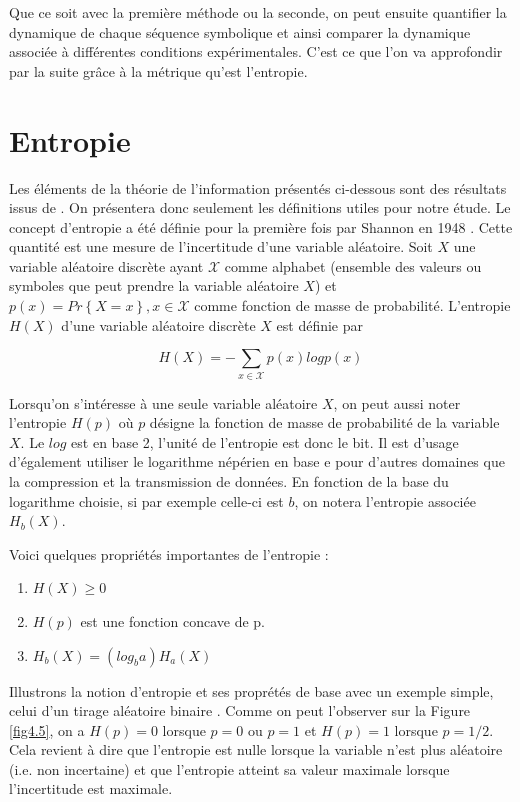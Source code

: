 \vspace{2ex}
Que ce soit avec la première méthode ou la seconde, on peut ensuite quantifier la dynamique de chaque séquence symbolique et ainsi comparer la dynamique associée à différentes conditions expérimentales. C'est ce que l'on va approfondir par la suite grâce à la métrique qu'est l'entropie.

\section{Entropie}

Les éléments de la théorie de l'information présentés ci-dessous sont des résultats issus de \cite{2}. On présentera donc seulement les définitions utiles pour notre étude.
Le concept d'entropie a été définie pour la première fois par Shannon en 1948 \cite{21}. Cette quantité est une mesure de l'incertitude d'une variable aléatoire.
Soit $X$ une variable aléatoire discrète ayant $\mathcal{X}$ comme alphabet (ensemble des valeurs ou symboles que peut prendre la variable aléatoire $X$) et $p(x)=Pr\left\{X=x\right\}, x \in \mathcal{X}$ comme fonction de masse de probabilité. 
L'entropie $H(X)$ d'une variable aléatoire discrète $X$ est définie par

\begin{equation}
    H(X) = - \sum_{x \in \mathcal{X}} p(x)logp(x)
\end{equation}

Lorsqu'on s'intéresse à une seule variable aléatoire $X$, on peut aussi noter l'entropie $H(p)$ où $p$ désigne la fonction de masse de probabilité de la variable $X$.
Le $log$ est en base 2, l'unité de l'entropie est donc le bit. Il est d'usage d'également utiliser le logarithme népérien en base e pour d'autres domaines que la compression et la transmission de données. En fonction de la base du logarithme choisie, si par exemple celle-ci est $b$, on notera l'entropie associée $H_b(X)$. 

Voici quelques propriétés importantes de l'entropie :
\begin{enumerate}
    \item $H(X)\geq0$
    \item $H(p)$ est une fonction concave de p.
    \item $H_b(X)=(log_{b}a)H_{a}(X)$
\end{enumerate}

Illustrons la notion d'entropie et ses proprétés de base avec un exemple simple, celui d'un tirage aléatoire binaire \cite{8}. Comme on peut l'observer sur la Figure \ref{fig4.5}, on a $H(p)=0$ lorsque $p=0$ ou $p=1$ et $H(p)=1$ lorsque $p=1/2$. Cela revient à dire que l'entropie est nulle lorsque la variable n'est plus aléatoire (i.e. non incertaine) et que l'entropie atteint sa valeur maximale lorsque l'incertitude est maximale.

